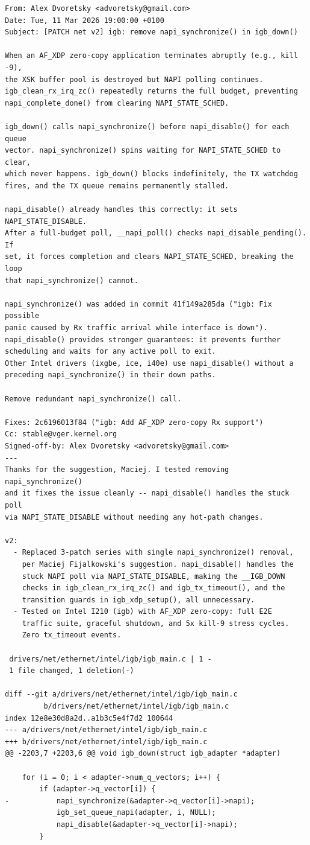\documentclass[11pt,a4paper,openany]{book}
\begin{document}
\begin{Verbatim}[fontsize=\scriptsize, frame=single]
From: Alex Dvoretsky <advoretsky@gmail.com>
Date: Tue, 11 Mar 2026 19:00:00 +0100
Subject: [PATCH net v2] igb: remove napi_synchronize() in igb_down()

When an AF_XDP zero-copy application terminates abruptly (e.g., kill -9),
the XSK buffer pool is destroyed but NAPI polling continues.
igb_clean_rx_irq_zc() repeatedly returns the full budget, preventing
napi_complete_done() from clearing NAPI_STATE_SCHED.

igb_down() calls napi_synchronize() before napi_disable() for each queue
vector. napi_synchronize() spins waiting for NAPI_STATE_SCHED to clear,
which never happens. igb_down() blocks indefinitely, the TX watchdog
fires, and the TX queue remains permanently stalled.

napi_disable() already handles this correctly: it sets NAPI_STATE_DISABLE.
After a full-budget poll, __napi_poll() checks napi_disable_pending(). If
set, it forces completion and clears NAPI_STATE_SCHED, breaking the loop
that napi_synchronize() cannot.

napi_synchronize() was added in commit 41f149a285da ("igb: Fix possible
panic caused by Rx traffic arrival while interface is down").
napi_disable() provides stronger guarantees: it prevents further
scheduling and waits for any active poll to exit.
Other Intel drivers (ixgbe, ice, i40e) use napi_disable() without a
preceding napi_synchronize() in their down paths.

Remove redundant napi_synchronize() call.

Fixes: 2c6196013f84 ("igb: Add AF_XDP zero-copy Rx support")
Cc: stable@vger.kernel.org
Signed-off-by: Alex Dvoretsky <advoretsky@gmail.com>
---
Thanks for the suggestion, Maciej. I tested removing napi_synchronize()
and it fixes the issue cleanly -- napi_disable() handles the stuck poll
via NAPI_STATE_DISABLE without needing any hot-path changes.

v2:
  - Replaced 3-patch series with single napi_synchronize() removal,
    per Maciej Fijalkowski's suggestion. napi_disable() handles the
    stuck NAPI poll via NAPI_STATE_DISABLE, making the __IGB_DOWN
    checks in igb_clean_rx_irq_zc() and igb_tx_timeout(), and the
    transition guards in igb_xdp_setup(), all unnecessary.
  - Tested on Intel I210 (igb) with AF_XDP zero-copy: full E2E
    traffic suite, graceful shutdown, and 5x kill-9 stress cycles.
    Zero tx_timeout events.

 drivers/net/ethernet/intel/igb/igb_main.c | 1 -
 1 file changed, 1 deletion(-)

diff --git a/drivers/net/ethernet/intel/igb/igb_main.c
         b/drivers/net/ethernet/intel/igb/igb_main.c
index 12e8e30d8a2d..a1b3c5e4f7d2 100644
--- a/drivers/net/ethernet/intel/igb/igb_main.c
+++ b/drivers/net/ethernet/intel/igb/igb_main.c
@@ -2203,7 +2203,6 @@ void igb_down(struct igb_adapter *adapter)

 	for (i = 0; i < adapter->num_q_vectors; i++) {
 		if (adapter->q_vector[i]) {
-			napi_synchronize(&adapter->q_vector[i]->napi);
 			igb_set_queue_napi(adapter, i, NULL);
 			napi_disable(&adapter->q_vector[i]->napi);
 		}
\end{Verbatim}
\end{document}
